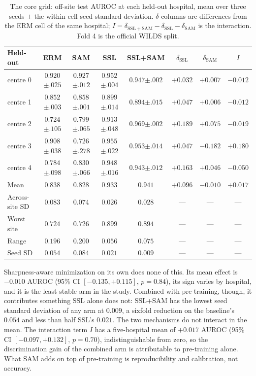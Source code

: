 \documentclass[10pt]{article} %
\begin{document}
\begin{table}[t]
\centering
\caption{The core grid: off-site test AUROC at each held-out hospital, mean
over three seeds $\pm$ the within-cell seed standard deviation. $\delta$
columns are differences from the ERM cell of the same hospital;
$I = \delta_{\mathrm{SSL+SAM}} - \delta_{\mathrm{SSL}} - \delta_{\mathrm{SAM}}$
is the interaction. Fold 4 is the official WILDS split.}
\label{tab:grid}
\small
\begin{tabular}{lccccccc}
\toprule
Held-out & ERM & SAM & SSL & SSL+SAM
& $\delta_{\mathrm{SSL}}$ & $\delta_{\mathrm{SAM}}$ & $I$ \\
\midrule
centre 0 & $0.920${\scriptsize$\pm.025$} & $0.927${\scriptsize$\pm.012$} & $0.952${\scriptsize$\pm.004$} & $0.947${\scriptsize$\pm.002$} & $+0.032$ & $+0.007$ & $-0.012$ \\
centre 1 & $0.852${\scriptsize$\pm.003$} & $0.858${\scriptsize$\pm.001$} & $0.899${\scriptsize$\pm.014$} & $0.894${\scriptsize$\pm.015$} & $+0.047$ & $+0.006$ & $-0.012$ \\
centre 2 & $0.724${\scriptsize$\pm.105$} & $0.799${\scriptsize$\pm.065$} & $0.913${\scriptsize$\pm.048$} & $0.969${\scriptsize$\pm.002$} & $+0.189$ & $+0.075$ & $-0.019$ \\
centre 3 & $0.908${\scriptsize$\pm.038$} & $0.726${\scriptsize$\pm.278$} & $0.955${\scriptsize$\pm.022$} & $0.953${\scriptsize$\pm.014$} & $+0.047$ & $-0.182$ & $+0.180$ \\
centre 4 & $0.784${\scriptsize$\pm.098$} & $0.830${\scriptsize$\pm.066$} & $0.948${\scriptsize$\pm.016$} & $0.943${\scriptsize$\pm.012$} & $+0.163$ & $+0.046$ & $-0.050$ \\
\midrule
Mean        & $0.838$ & $0.828$ & $0.933$ & $0.941$ & $+0.096$ & $-0.010$ & $+0.017$ \\
Across-site SD & $0.083$ & $0.074$ & $\mathbf{0.026}$ & $0.028$ & --- & --- & --- \\
Worst site  & $0.724$ & $0.726$ & $\mathbf{0.899}$ & $0.894$ & --- & --- & --- \\
Range       & $0.196$ & $0.200$ & $\mathbf{0.056}$ & $0.075$ & --- & --- & --- \\
Seed SD     & $0.054$ & $0.084$ & $0.021$ & $\mathbf{0.009}$ & --- & --- & --- \\
\bottomrule
\end{tabular}
\end{table}

Sharpness-aware minimization on its own does none of this. Its mean effect is
$-0.010$ AUROC (95\% CI $[-0.135, +0.115]$, $p=0.84$), its sign varies by
hospital, and it is the least stable arm in the study. Combined with
pre-training, though, it contributes something SSL alone does not: SSL+SAM has
the lowest seed standard deviation of any arm at $0.009$, a sixfold reduction
on the baseline's $0.054$ and less than half SSL's $0.021$. The two mechanisms
do not interact in the mean. The interaction term $I$ has a five-hospital mean
of $+0.017$ AUROC (95\% CI $[-0.097, +0.132]$, $p=0.70$), indistinguishable
from zero, so the discrimination gain of the combined arm is attributable to
pre-training alone. What SAM adds on top of pre-training is reproducibility and
calibration, not accuracy.
\end{document}
